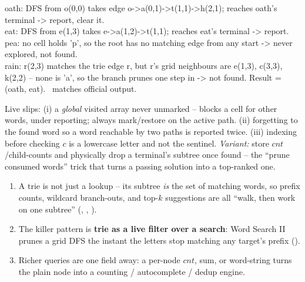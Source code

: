 \begin{tracebox}
oath: DFS from o(0,0) takes edge o->a(0,1)->t(1,1)->h(2,1); reaches oath's terminal -> report, clear it.\\
eat: DFS from e(1,3) takes e->a(1,2)->t(1,1); reaches eat's terminal -> report.\\
pea: no cell holds 'p', so the root has no matching edge from any start -> never explored, not found.\\
rain: r(2,3) matches the trie edge r, but r's grid neighbours are e(1,3), c(3,3), k(2,2) -- none is 'a',
so the branch prunes one step in -> not found. Result = (oath, eat). \checkmark\ matches official output.
\end{tracebox}


\begin{warningbox}
Live slips: (i) a \emph{global} visited array never unmarked -- blocks a cell for other words, under
reporting; always mark/restore on the active path. (ii) forgetting to  the found word so a
word reachable by two paths is reported twice. (iii) indexing  before checking $c$ is a
lowercase letter and not the sentinel. \emph{Variant:} store $\mathit{cnt}$/child-counts and physically
drop a terminal's subtree once found -- the ``prune consumed words'' trick that turns a passing solution
into a top-ranked one.
\end{warningbox}

\begin{insightbox}
\begin{enumerate}[nosep, leftmargin=1.6em]
  \item A trie is not just a lookup -- its subtree \emph{is} the set of matching words, so prefix
        counts, wildcard branch-outs, and top-$k$ suggestions are all ``walk, then work on one subtree''
        (, , ).
  \item The killer pattern is \textbf{trie as a live filter over a search}: Word Search II prunes a grid
        DFS the instant the letters stop matching any target's prefix ().
  \item Richer queries are one field away: a per-node $\mathit{cnt}$, sum, or word-string turns the plain
        node into a counting / autocomplete / dedup engine.
\end{enumerate}
\end{insightbox}

